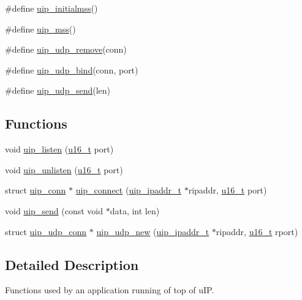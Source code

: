 \begin{DoxyCompactItemize}
\item 
\#define \hyperlink{group__uipappfunc_gaa87feebc7cffd4d8300e776cf64e4fec}{uip\_\-initialmss}()
\item 
\#define \hyperlink{group__uipappfunc_gab5fecbc62edd128012cea0f47b57ab9f}{uip\_\-mss}()
\item 
\#define \hyperlink{group__uipappfunc_gaf2dbaceb10c67783a115075b5b6d66df}{uip\_\-udp\_\-remove}(conn)
\item 
\#define \hyperlink{group__uipappfunc_gaa20812098a4663c8a9fc4ce8e95391b6}{uip\_\-udp\_\-bind}(conn, port)
\item 
\#define \hyperlink{group__uipappfunc_gae5ab69d40013e6cf86ef1763c95d920e}{uip\_\-udp\_\-send}(len)
\end{DoxyCompactItemize}
\subsection*{Functions}
\begin{DoxyCompactItemize}
\item 
void \hyperlink{group__uipappfunc_gadd1ab3704ecd4900eec61a6897d32dc8}{uip\_\-listen} (\hyperlink{group__uipfw_ga77570ac4fcab86864fa1916e55676da2}{u16\_\-t} port)
\item 
void \hyperlink{group__uipappfunc_gaaa585784b0914cac1d37f07f85457008}{uip\_\-unlisten} (\hyperlink{group__uipfw_ga77570ac4fcab86864fa1916e55676da2}{u16\_\-t} port)
\item 
struct \hyperlink{structuip__conn}{uip\_\-conn} $\ast$ \hyperlink{group__uipappfunc_ga8096b0c4b543dc408f4dd031ddae7240}{uip\_\-connect} (\hyperlink{group__uip_ga1ef35301f43a5bbb9f89f07b5a36b9a0}{uip\_\-ipaddr\_\-t} $\ast$ripaddr, \hyperlink{group__uipfw_ga77570ac4fcab86864fa1916e55676da2}{u16\_\-t} port)
\item 
void \hyperlink{group__uipappfunc_ga04b053a623aac7cd4195157d470661b3}{uip\_\-send} (const void $\ast$data, int len)
\item 
struct \hyperlink{structuip__udp__conn}{uip\_\-udp\_\-conn} $\ast$ \hyperlink{group__uipappfunc_ga79c4110211247df3fb30b8cf1c4c02af}{uip\_\-udp\_\-new} (\hyperlink{group__uip_ga1ef35301f43a5bbb9f89f07b5a36b9a0}{uip\_\-ipaddr\_\-t} $\ast$ripaddr, \hyperlink{group__uipfw_ga77570ac4fcab86864fa1916e55676da2}{u16\_\-t} rport)
\end{DoxyCompactItemize}


\subsection{Detailed Description}
Functions used by an application running of top of uIP. 

